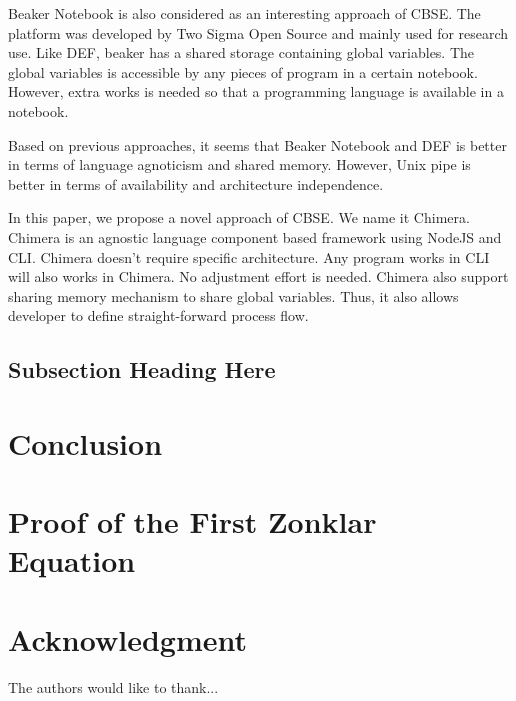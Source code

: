 \documentclass[conference]{IEEEtran}
\begin{document}
Beaker Notebook \cite{beakernotebook} is also considered as an interesting approach of CBSE. The platform was developed by Two Sigma Open Source and mainly used for research use. Like DEF, beaker has a shared storage containing global variables. The global variables is accessible by any pieces of program in a certain notebook. However, extra works is needed so that a programming language is available in a notebook.

Based on previous approaches, it seems that Beaker Notebook and DEF is better in terms of language agnoticism and shared memory. However, Unix pipe is better in terms of availability and architecture independence.

In this paper, we propose a novel approach of CBSE. We name it Chimera. Chimera is an agnostic language component based framework using NodeJS and CLI. Chimera doesn't require specific architecture. Any program works in CLI will also works in Chimera. No adjustment effort is needed. Chimera also support sharing memory mechanism to share global variables. Thus, it also allows developer to define straight-forward process flow.

\subsection{Subsection Heading Here}


\section{Conclusion}


\appendices
\section{Proof of the First Zonklar Equation}
\blindtext

\section*{Acknowledgment}
The authors would like to thank...

\ifCLASSOPTIONcaptionsoff
  \newpage
\fi




\end{document}
